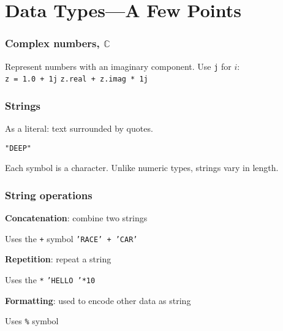 \documentclass[11pt]{beamer}
\begin{document}
\section{Data Types---A Few Points}

\begin{frame}
  \frametitle{Complex numbers, $\mathbb{C}$}
  \Enlarge

  \begin{itemize}
  \myitem  Represent numbers with an imaginary component.
  \myitem  Use \texttt{j} for $i$: \\
    \textcolor{CS101GradBot}{\texttt{z = 1.0 + 1j}} \pause
  \myitem  \texttt{z.real + z.imag * 1j}
  \end{itemize}
\end{frame}

\begin{frame}
  \frametitle{Strings}
  \Enlarge

  \begin{itemize}
  \myitem  As a literal:  text surrounded by quotes.
    \begin{itemize}
    \mysubitem  \texttt{"DEEP"}
    \end{itemize}
  \myitem  Each symbol is a character.
  \myitem  Unlike numeric types, strings vary in length.
  \end{itemize}
\end{frame}

\begin{frame}
  \frametitle{String operations}
  \Enlarge

  \begin{itemize}
  \myitem  \textbf{Concatenation}:  combine two strings
    \begin{itemize}
    \mysubitem  Uses the \texttt{+} symbol
    \mysubitem  \texttt{'RACE' + 'CAR'}
    \end{itemize}
  \myitem  \textbf{Repetition}:  repeat a string
    \begin{itemize}
    \mysubitem  Uses the \texttt{*}
    \mysubitem  \texttt{'HELLO '*10}
    \end{itemize}
  \myitem  \textbf{Formatting}:  used to encode other data as string
    \begin{itemize}
    \mysubitem  Uses \texttt{\%} symbol
    \end{itemize}
  \end{itemize}
\end{frame}
\end{document}
